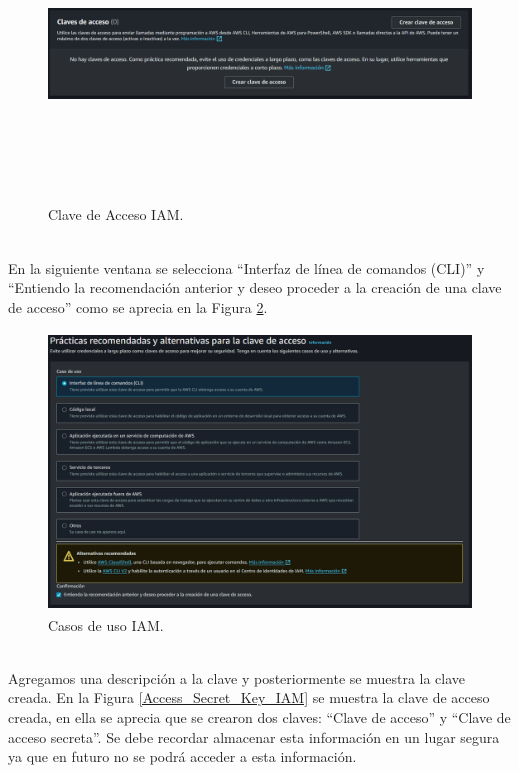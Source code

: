 \documentclass[a4paper,10pt, oneside, titlepage]{article}
\begin{document}
	\begin{figure}[!h]
		\centering
		\includegraphics[width = 1\linewidth, height = 7.8cm]{Clave_Acceso_IAM.png}
		\caption{Clave de Acceso IAM.}
		\label{Clave_Acceso_IAM}
	\end{figure} \\
	\indent En la siguiente ventana se selecciona ``Interfaz de línea de comandos (CLI)'' y ``Entiendo la recomendación anterior y deseo proceder a la creación de una clave de acceso'' como se aprecia en la Figura \ref{CLI_IAM}.
	\begin{figure}[!h]
		\centering
		\includegraphics[width = 1\linewidth, height = 7.4cm]{CLI_IAM.png}
		\caption{Casos de uso IAM.}
		\label{CLI_IAM}
	\end{figure} \\
	\indent Agregamos una descripción a la clave y posteriormente se  muestra la clave creada. En la Figura \ref{Access_Secret_Key_IAM} se muestra la clave de acceso creada, en ella se aprecia que se crearon dos claves: ``Clave de acceso'' y ``Clave de acceso secreta''.  Se debe recordar almacenar esta información en un lugar segura ya que en futuro no se podrá acceder a esta información.
\end{document}
